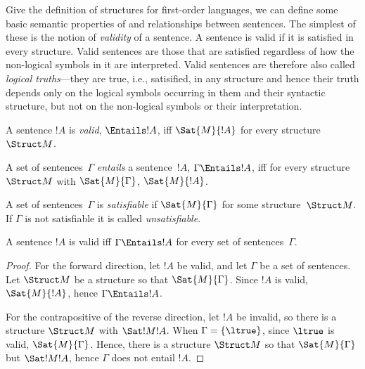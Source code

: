 \documentclass[../../include/open-logic-section]{subfiles}
\begin{document}

\begin{wordy}
Give the definition of structures for first-order languages, we can
define some basic semantic properties of and relationships between
sentences.  The simplest of these is the notion of \emph{validity} of
a sentence.  A sentence is valid if it is satisfied in every
structure.  Valid sentences are those that are satisfied regardless of
how the non-logical symbols in it are interpreted.  Valid sentences
are therefore also called \emph{logical truths}---they are true, i.e.,
satisified, in any structure and hence their truth depends only on the
logical symbols occurring in them and their syntactic structure, but not
on the non-logical symbols or their interpretation.  
\end{wordy}

\begin{defn}[Validity]
A sentence $!A$ is \emph{valid}, $\Entails !A$, iff $\Sat{M}{!A}$ for every
structure~$\Struct M$.
\end{defn}

\begin{defn}[Entailment]
A set of sentences~$\Gamma$ \emph{entails} a sentence~$!A$, $\Gamma
\Entails !A$, iff for every structure~$\Struct M$ with
$\Sat{M}{\Gamma}$, $\Sat{M}{!A}$.
\end{defn}

\begin{defn}[Satisfiability]
A set of sentences~$\Gamma$ is \emph{satisfiable} if $\Sat{M}{\Gamma}$
for some structure~$\Struct M$.  If $\Gamma$ is not satisfiable it is
called \emph{unsatisfiable}.
\end{defn}

\begin{prop}
A sentence $!A$ is valid iff $\Gamma \Entails !A$ for every set of
sentences~$\Gamma$.
\end{prop}

\begin{proof}
For the forward direction, let $!A$ be valid, and let $\Gamma$ be a
set of sentences. Let $\Struct M$ be a structure so that
$\Sat{M}{\Gamma}$. Since $!A$ is valid, $\Sat{M}{!A}$, hence $\Gamma
\Entails !A$.

For the contrapositive of the reverse direction, let $!A$ be invalid,
so there is a structure $\Struct M$ with $\Sat!{M}{!A}$. When $\Gamma
= \{ \ltrue \}$, since $\ltrue$ is valid, $\Sat{M}{\Gamma}$. Hence,
there is a structure $\Struct M$ so that $\Sat{M}{\Gamma}$ but
$\Sat!{M}{!A}$, hence $\Gamma$ does not entail $!A$.
\end{proof}
\end{document}
